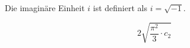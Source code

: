 Die imaginäre Einheit $i$ ist definiert als $i = \sqrt{-1}$.

\begin{equation}
  2 \sqrt{\frac{\pi^2}{3} \cdot c_2}
\end{equation}